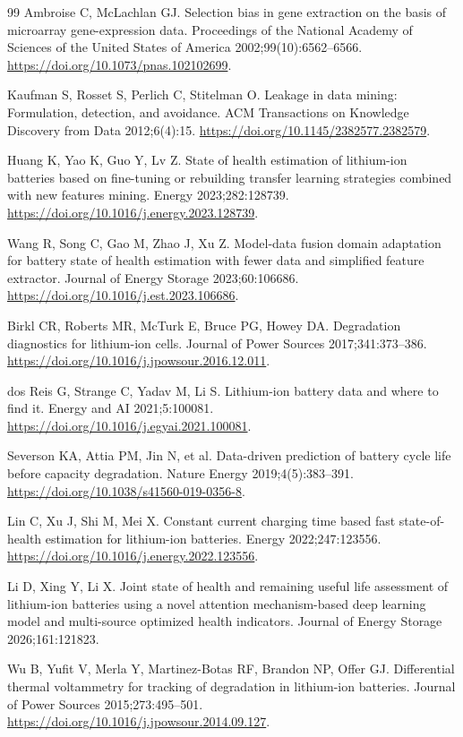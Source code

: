 \begin{thebibliography}{99}
 Ambroise C, McLachlan GJ. Selection bias in gene extraction on the basis of microarray gene-expression data. Proceedings of the National Academy of Sciences of the United States of America 2002;99(10):6562–6566. \url{https://doi.org/10.1073/pnas.102102699}.

 Kaufman S, Rosset S, Perlich C, Stitelman O. Leakage in data mining: Formulation, detection, and avoidance. ACM Transactions on Knowledge Discovery from Data 2012;6(4):15. \url{https://doi.org/10.1145/2382577.2382579}.

 Huang K, Yao K, Guo Y, Lv Z. State of health estimation of lithium-ion batteries based on fine-tuning or rebuilding transfer learning strategies combined with new features mining. Energy 2023;282:128739. \url{https://doi.org/10.1016/j.energy.2023.128739}.

 Wang R, Song C, Gao M, Zhao J, Xu Z. Model-data fusion domain adaptation for battery state of health estimation with fewer data and simplified feature extractor. Journal of Energy Storage 2023;60:106686. \url{https://doi.org/10.1016/j.est.2023.106686}.

 Birkl CR, Roberts MR, McTurk E, Bruce PG, Howey DA. Degradation diagnostics for lithium-ion cells. Journal of Power Sources 2017;341:373–386. \url{https://doi.org/10.1016/j.jpowsour.2016.12.011}.

 dos Reis G, Strange C, Yadav M, Li S. Lithium-ion battery data and where to find it. Energy and AI 2021;5:100081. \url{https://doi.org/10.1016/j.egyai.2021.100081}.

 Severson KA, Attia PM, Jin N, et al. Data-driven prediction of battery cycle life before capacity degradation. Nature Energy 2019;4(5):383–391. \url{https://doi.org/10.1038/s41560-019-0356-8}.

 Lin C, Xu J, Shi M, Mei X. Constant current charging time based fast state-of-health estimation for lithium-ion batteries. Energy 2022;247:123556. \url{https://doi.org/10.1016/j.energy.2022.123556}.

 Li D, Xing Y, Li X. Joint state of health and remaining useful life assessment of lithium-ion batteries using a novel attention mechanism-based deep learning model and multi-source optimized health indicators. Journal of Energy Storage 2026;161:121823.

 Wu B, Yufit V, Merla Y, Martinez-Botas RF, Brandon NP, Offer GJ. Differential thermal voltammetry for tracking of degradation in lithium-ion batteries. Journal of Power Sources 2015;273:495–501. \url{https://doi.org/10.1016/j.jpowsour.2014.09.127}.


\end{thebibliography}
